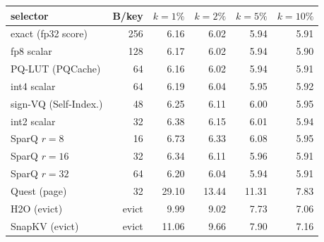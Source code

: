 \begin{tabular}{l r r r r r}
\toprule
selector & B/key & $k{=}1\%$ & $k{=}2\%$ & $k{=}5\%$ & $k{=}10\%$ \\
\midrule
exact (fp32 score) & 256 & 6.16 & 6.02 & 5.94 & 5.91 \\
fp8 scalar & 128 & 6.17 & 6.02 & 5.94 & 5.90 \\
PQ-LUT (PQCache) & 64 & 6.16 & 6.02 & 5.94 & 5.91 \\
int4 scalar & 64 & 6.19 & 6.04 & 5.95 & 5.92 \\
sign-VQ (Self-Index.) & 48 & 6.25 & 6.11 & 6.00 & 5.95 \\
int2 scalar & 32 & 6.38 & 6.15 & 6.01 & 5.94 \\
SparQ $r{=}8$ & 16 & 6.73 & 6.33 & 6.08 & 5.95 \\
SparQ $r{=}16$ & 32 & 6.34 & 6.11 & 5.96 & 5.91 \\
SparQ $r{=}32$ & 64 & 6.20 & 6.04 & 5.94 & 5.91 \\
Quest (page) & 32 & 29.10 & 13.44 & 11.31 & 7.83 \\
H2O (evict) & evict & 9.99 & 9.02 & 7.73 & 7.06 \\
SnapKV (evict) & evict & 11.06 & 9.66 & 7.90 & 7.16 \\
\bottomrule
\end{tabular}
